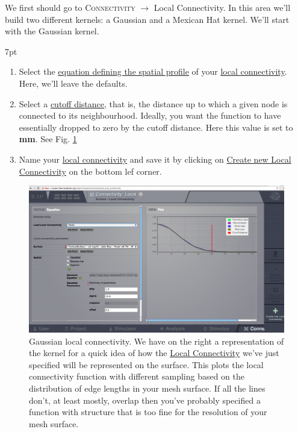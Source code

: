 \documentclass{tufte-handout}
\newenvironment{formal}{%
  \def\FrameCommand{%
    \hspace{1pt}%
    {\color{DarkBlue}\vrule width 2pt}%
    {\color{formalshade}\vrule width 4pt}%
    \colorbox{formalshade}%
  }%
  \MakeFramed{\advance\hsize-\width\FrameRestore}%
  \noindent\hspace{-4.55pt}%
  \begin{adjustwidth}{}{7pt}%
  \vspace{2pt}\vspace{2pt}%
}
{%
  \vspace{2pt}\end{adjustwidth}\endMakeFramed%
}
\begin{document}
We first should go to \textsc{Connectivity} $\rightarrow$ {Local Connectivity}. 
In this area we'll build two different kernels: a Gaussian and a Mexican Hat kernel. 
We'll start with the Gaussian kernel. 

\begin{formal}
\begin{enumerate}
\item Select the \underline{equation defining the spatial profile} of your \underline{local connectivity}. Here, we'll leave the defaults.
\item Select a \underline{cutoff distance}, that is, the distance up to which a given node is connected to its neighbourhood. Ideally, you want the function to have essentially dropped to zero by the cutoff distance. Here this value is set to \textbf{\unit[40]{mm}}. See Fig. \ref{fig:lc_gaussian}
\item Name your \underline{local connectivity} and save it by clicking on \underline{Create new Local Connectivity} on the bottom lef corner. 
\end{enumerate}
\end{formal}

\begin{figure}[h]
  \includegraphics[width=\linewidth]{Handout_UI_BuildingYourOwnBrainNetworkModel_YourOwnLocalConnectivity}%
  \caption{Gaussian local connectivity. We have on the right a representation of the kernel for a quick idea of how
the \underline{Local Connectivity} we've just specified will be represented on the
surface. This plots the local connectivity function with different sampling
based on the distribution of edge lengths in your mesh surface. If all the
lines don't, at least mostly, overlap then you've probably specified a
function with structure that is too fine for the resolution of your mesh
surface. }%
  \label{fig:lc_gaussian}%
\end{figure}
\end{document}
